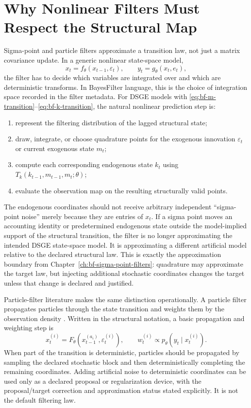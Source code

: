 \section{Why Nonlinear Filters Must Respect the Structural Map}
\label{sec:bf-nonlinear-filters-need-structural-map}

Sigma-point and particle filters approximate a transition law, not just a
matrix covariance update.  In a generic nonlinear state-space model,
\[
  x_t = f_\theta(x_{t-1}, \varepsilon_t),\qquad
  y_t = g_\theta(x_t, e_t),
\]
the filter has to decide which variables are integrated over and which are
deterministic transforms.  In BayesFilter language, this is the choice of
integration space recorded in the filter metadata.  For DSGE models with
\eqref{eq:bf-m-transition}--\eqref{eq:bf-k-transition}, the natural nonlinear
prediction step is:
\begin{enumerate}[label=(\roman*)]
  \item represent the filtering distribution of the lagged structural state;
  \item draw, integrate, or choose quadrature points for the exogenous
    innovation $\varepsilon_t$ or current exogenous state $m_t$;
  \item compute each corresponding endogenous state $k_t$ using
    $T_k(k_{t-1},m_{t-1},m_t;\theta)$;
  \item evaluate the observation map on the resulting structurally valid
    points.
\end{enumerate}
The endogenous coordinates should not receive arbitrary independent
``sigma-point noise'' merely because they are entries of $x_t$.  If a sigma
point moves an accounting identity or predetermined endogenous state outside
the model-implied support of the structural transition, the filter is no longer
approximating the intended DSGE state-space model.  It is approximating a
different artificial model relative to the declared structural law.  This is
exactly the approximation boundary from Chapter~\ref{ch:bf-sigma-point-filters}:
quadrature may approximate the target law, but injecting additional stochastic
coordinates changes the target unless that change is declared and justified.

Particle-filter literature makes the same distinction operationally.  A
particle filter propagates particles through the state transition and weights
them by the observation density \citep{gordon1993novel,doucet2001sequential,
andrieu2010particle}.  Written in the structural notation, a basic propagation
and weighting step is
\begin{equation}
  x_t^{(i)} = F_\theta\!\left(x_{t-1}^{(a_i)},\varepsilon_t^{(i)}\right),
  \qquad
  w_t^{(i)} \propto p_\theta\!\left(y_t\mid x_t^{(i)}\right).
\end{equation}
When part of the transition is deterministic, particles should be propagated by
sampling the declared stochastic block and then deterministically completing the
remaining coordinates.  Adding artificial noise to deterministic coordinates can
be used only as a declared proposal or regularization device, with the
proposal/target correction and approximation status stated explicitly.  It is
not the default filtering law.

